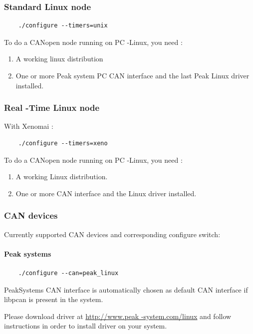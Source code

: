 \documentclass[12pt,english,a4paper]{book}
\newcommand{\canopen}{CANopen }
\begin{document}
\subsubsection{Standard Linux node}


\begin{verbatim}
	./configure --timers=unix
\end{verbatim}


To do a \canopen node running on PC -Linux, you need :

\begin{enumerate}
\item A working linux distribution 
\item One or more Peak system PC CAN interface and the last Peak Linux driver
installed. 
\end{enumerate}

\subsubsection{Real -Time Linux node}

With Xenomai :
\begin{verbatim}
	./configure --timers=xeno
\end{verbatim}

To do a \canopen node running on PC -Linux, you need :

\begin{enumerate}
\item A working Linux distribution. 
\item One or more CAN interface and the Linux driver installed. 
\end{enumerate}

\subsubsection{CAN devices}
Currently supported CAN devices and corresponding configure switch:

\paragraph{Peak systems}
\begin{verbatim}
	./configure --can=peak_linux
\end{verbatim}
PeakSystems CAN interface is automatically chosen as default CAN interface
if libpcan is present in the system.

Please download driver at \href{http://www.peak-system.com/linux}{http://www.peak
-system.com/linux} and follow instructions in order to install driver
on your system.
\end{document}
